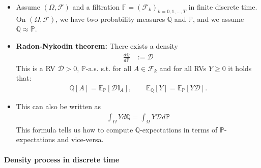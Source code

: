 \documentclass[a4paper,landscape,8pt,fleqn]{scrartcl}
\renewcommand{\emph}[1]{\textbf{#1}}
\begin{document}
\begin{multicols*}{3}
\begin{itemize}
\item Assume $(\Omega, \mathcal{F})$ and a filtration $\mathbb{F} = (\mathcal{F}_k)_{k=0,1,\ldots,T}$ in finite discrete time. \\
On $(\Omega, \mathcal{F})$, we have two probability measures $\mathbb{Q}$ and $\mathbb{P}$, and we assume $\mathbb{Q} \approx \mathbb{P}$.
\item \emph{Radon-Nykodin theorem:} There exists a density
\begin{align*}
\frac{d\mathbb{Q}}{d\mathbb{P}} &:= \mathcal{D}
\end{align*}
This is a RV $\mathcal{D} > 0$, $\mathbb{P}$-a.s. s.t. for all $A \in \mathcal{F}_k$ and for all RVs $Y \geq 0$ it holds that:
\begin{align*}
\mathbb{Q}[A] = \mathbb{E}_\mathbb{P}[\mathcal{D} \mathbb{I}_A], \qquad \mathbb{E}_\mathbb{Q}[Y] = \mathbb{E}_\mathbb{P}[Y \mathcal{D}].
\end{align*}
\item This can also be written as
\begin{align*}
\int_\Omega Y d\mathbb{Q} = \int_\Omega Y \mathcal{D} d\mathbb{P}
\end{align*}
This formula tells us how to compute $\mathbb{Q}$-expectations in terms of $\mathbb{P}$-expectations and vice-versa.
\end{itemize}

\paragraph{Density process in discrete time}


\end{multicols*}
\end{document}
